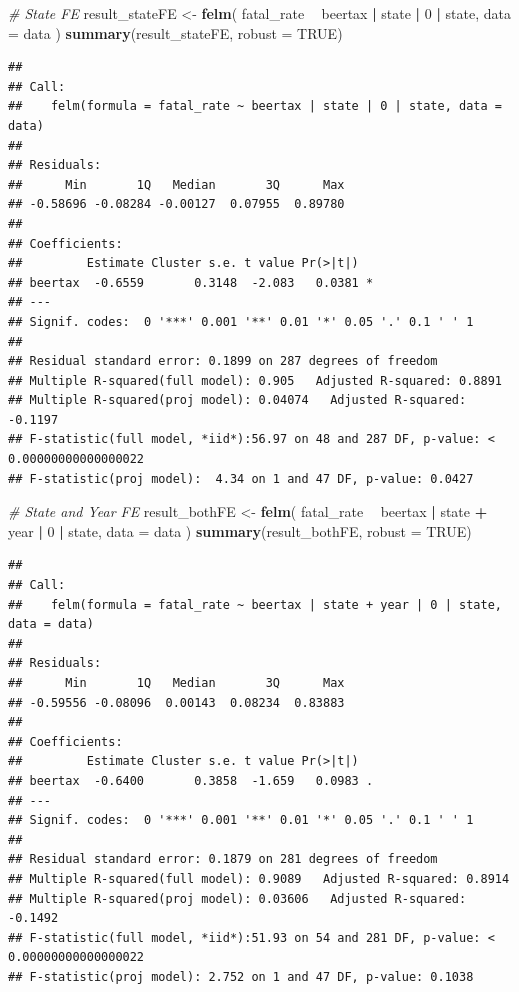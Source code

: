 \documentclass[]{book}
\newenvironment{Shaded}{\begin{snugshade}}{\end{snugshade}}
\newcommand{\KeywordTok}[1]{\textcolor[rgb]{0.13,0.29,0.53}{\textbf{#1}}}
\newcommand{\DataTypeTok}[1]{\textcolor[rgb]{0.13,0.29,0.53}{#1}}
\newcommand{\DecValTok}[1]{\textcolor[rgb]{0.00,0.00,0.81}{#1}}
\newcommand{\StringTok}[1]{\textcolor[rgb]{0.31,0.60,0.02}{#1}}
\newcommand{\CommentTok}[1]{\textcolor[rgb]{0.56,0.35,0.01}{\textit{#1}}}
\newcommand{\OtherTok}[1]{\textcolor[rgb]{0.56,0.35,0.01}{#1}}
\newcommand{\OperatorTok}[1]{\textcolor[rgb]{0.81,0.36,0.00}{\textbf{#1}}}
\newcommand{\NormalTok}[1]{#1}
\begin{document}
\begin{Shaded}
\begin{Highlighting}[]
\CommentTok{# State FE}
\NormalTok{result_stateFE <-}\StringTok{ }\KeywordTok{felm}\NormalTok{( fatal_rate }\OperatorTok{~}\StringTok{ }\NormalTok{beertax  }\OperatorTok{|}\StringTok{ }\NormalTok{state }\OperatorTok{|}\StringTok{ }\DecValTok{0} \OperatorTok{|}\StringTok{ }\NormalTok{state, }\DataTypeTok{data =}\NormalTok{ data )}
\KeywordTok{summary}\NormalTok{(result_stateFE, }\DataTypeTok{robust =} \OtherTok{TRUE}\NormalTok{)}
\end{Highlighting}
\end{Shaded}

\begin{verbatim}
## 
## Call:
##    felm(formula = fatal_rate ~ beertax | state | 0 | state, data = data) 
## 
## Residuals:
##      Min       1Q   Median       3Q      Max 
## -0.58696 -0.08284 -0.00127  0.07955  0.89780 
## 
## Coefficients:
##         Estimate Cluster s.e. t value Pr(>|t|)  
## beertax  -0.6559       0.3148  -2.083   0.0381 *
## ---
## Signif. codes:  0 '***' 0.001 '**' 0.01 '*' 0.05 '.' 0.1 ' ' 1
## 
## Residual standard error: 0.1899 on 287 degrees of freedom
## Multiple R-squared(full model): 0.905   Adjusted R-squared: 0.8891 
## Multiple R-squared(proj model): 0.04074   Adjusted R-squared: -0.1197 
## F-statistic(full model, *iid*):56.97 on 48 and 287 DF, p-value: < 0.00000000000000022 
## F-statistic(proj model):  4.34 on 1 and 47 DF, p-value: 0.0427
\end{verbatim}

\begin{Shaded}
\begin{Highlighting}[]
\CommentTok{# State and Year FE}
\NormalTok{result_bothFE <-}\StringTok{ }\KeywordTok{felm}\NormalTok{( fatal_rate }\OperatorTok{~}\StringTok{ }\NormalTok{beertax  }\OperatorTok{|}\StringTok{ }\NormalTok{state }\OperatorTok{+}\StringTok{ }\NormalTok{year }\OperatorTok{|}\StringTok{ }\DecValTok{0} \OperatorTok{|}\StringTok{ }\NormalTok{state, }\DataTypeTok{data =}\NormalTok{ data )}
\KeywordTok{summary}\NormalTok{(result_bothFE, }\DataTypeTok{robust =} \OtherTok{TRUE}\NormalTok{)}
\end{Highlighting}
\end{Shaded}

\begin{verbatim}
## 
## Call:
##    felm(formula = fatal_rate ~ beertax | state + year | 0 | state,      data = data) 
## 
## Residuals:
##      Min       1Q   Median       3Q      Max 
## -0.59556 -0.08096  0.00143  0.08234  0.83883 
## 
## Coefficients:
##         Estimate Cluster s.e. t value Pr(>|t|)  
## beertax  -0.6400       0.3858  -1.659   0.0983 .
## ---
## Signif. codes:  0 '***' 0.001 '**' 0.01 '*' 0.05 '.' 0.1 ' ' 1
## 
## Residual standard error: 0.1879 on 281 degrees of freedom
## Multiple R-squared(full model): 0.9089   Adjusted R-squared: 0.8914 
## Multiple R-squared(proj model): 0.03606   Adjusted R-squared: -0.1492 
## F-statistic(full model, *iid*):51.93 on 54 and 281 DF, p-value: < 0.00000000000000022 
## F-statistic(proj model): 2.752 on 1 and 47 DF, p-value: 0.1038
\end{verbatim}
\end{document}
